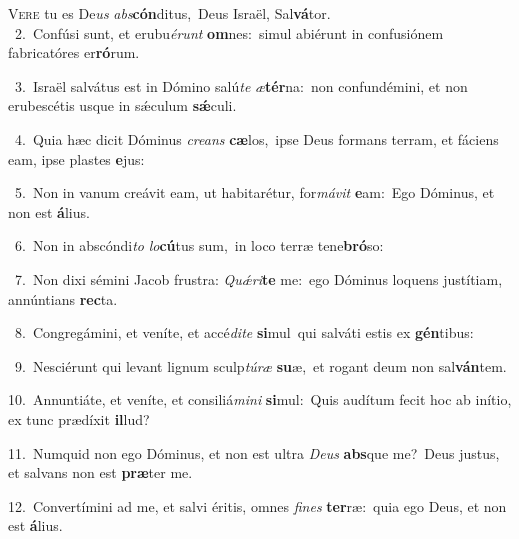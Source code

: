 \lettrine{\initial\textcolor{\initialcolor}{V}}{ere} tu es De\textit{us} \textit{abs}\-\textbf{cón}ditus,~\star Deus Israël, Sal\-\textbf{vá}\-tor.\\
{\numbfont\textcolor{\numbcolor}{~2.}}~Confúsi sunt, et erubu\-\textit{é}\-\textit{runt} \textbf{om}\-nes:~\star simul abiérunt in confusiónem fabricatóres er\-\textbf{ró}\-rum.\par
{\numbfont\textcolor{\numbcolor}{~3.}}~Israël salvátus est in Dómino salú\textit{te} \textit{æ}\-\textbf{tér}na:~\star non confundémini, et non erubescétis usque in sǽculum \textbf{sǽ}\-culi.\par
{\numbfont\textcolor{\numbcolor}{~4.}}~Quia hæc dicit Dóminus \textit{cre}\-\textit{ans} \textbf{cæ}\-los,~\star ipse Deus formans terram, et fáciens eam, ipse plastes \textbf{e}\-jus:\par
{\numbfont\textcolor{\numbcolor}{~5.}}~Non in vanum creávit eam, ut habitarétur, for\-\textit{má}\-\textit{vit} \textbf{e}\-am:~\star Ego Dóminus, et non est \textbf{á}\-lius.\par
{\numbfont\textcolor{\numbcolor}{~6.}}~Non in abscóndi\textit{to} \textit{lo}\-\textbf{cú}tus sum,~\star in loco terræ tene\-\textbf{bró}\-so:\par
{\numbfont\textcolor{\numbcolor}{~7.}}~Non dixi sémini Jacob frustra: \textit{Quǽ}\-\textit{ri}\textbf{te} me:~\star ego Dóminus loquens justítiam, annúntians \textbf{rec}\-ta.\par
{\numbfont\textcolor{\numbcolor}{~8.}}~Congregámini, et veníte, et accé\-\textit{di}\-\textit{te} \textbf{si}\-mul~\star qui salváti estis ex \textbf{gén}\-tibus:\par
{\numbfont\textcolor{\numbcolor}{~9.}}~Nesciérunt qui levant lignum sculp\-\textit{tú}\-\textit{ræ} \textbf{su}\-æ,~\star et rogant deum non sal\-\textbf{ván}\-tem.\par
{\numbfont\textcolor{\numbcolor}{10.}}~Annuntiáte, et veníte, et consiliá\-\textit{mi}\-\textit{ni} \textbf{si}\-mul:~\star Quis audítum fecit hoc ab inítio, ex tunc prædíxit \textbf{il}\-lud?\par
{\numbfont\textcolor{\numbcolor}{11.}}~Numquid non ego Dóminus, et non est ultra \textit{De}\-\textit{us} \textbf{abs}\-que me?~\star Deus justus, et salvans non est \textbf{præ}\-ter me.\par
{\numbfont\textcolor{\numbcolor}{12.}}~Convertímini ad me, et salvi éritis, omnes \textit{fi}\-\textit{nes} \textbf{ter}\-ræ:~\star quia ego Deus, et non est \textbf{á}\-lius.\par
